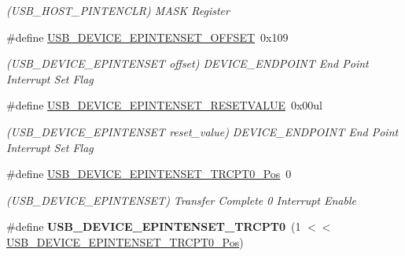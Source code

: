 \begin{DoxyCompactItemize}
\begin{DoxyCompactList}\small\item\em (U\+S\+B\+\_\+\+H\+O\+S\+T\+\_\+\+P\+I\+N\+T\+E\+N\+C\+L\+R) M\+A\+S\+K Register \end{DoxyCompactList}\item 
\hypertarget{group___s_a_m_l21___u_s_b_ga59337d0066849bd4f531ba5efcd153c9}{}\#define \hyperlink{group___s_a_m_l21___u_s_b_ga59337d0066849bd4f531ba5efcd153c9}{U\+S\+B\+\_\+\+D\+E\+V\+I\+C\+E\+\_\+\+E\+P\+I\+N\+T\+E\+N\+S\+E\+T\+\_\+\+O\+F\+F\+S\+E\+T}~0x109\label{group___s_a_m_l21___u_s_b_ga59337d0066849bd4f531ba5efcd153c9}

\begin{DoxyCompactList}\small\item\em (U\+S\+B\+\_\+\+D\+E\+V\+I\+C\+E\+\_\+\+E\+P\+I\+N\+T\+E\+N\+S\+E\+T offset) D\+E\+V\+I\+C\+E\+\_\+\+E\+N\+D\+P\+O\+I\+N\+T End Point Interrupt Set Flag \end{DoxyCompactList}\item 
\hypertarget{group___s_a_m_l21___u_s_b_ga51ab3a66f621e31c55e0676d4d6484a1}{}\#define \hyperlink{group___s_a_m_l21___u_s_b_ga51ab3a66f621e31c55e0676d4d6484a1}{U\+S\+B\+\_\+\+D\+E\+V\+I\+C\+E\+\_\+\+E\+P\+I\+N\+T\+E\+N\+S\+E\+T\+\_\+\+R\+E\+S\+E\+T\+V\+A\+L\+U\+E}~0x00ul\label{group___s_a_m_l21___u_s_b_ga51ab3a66f621e31c55e0676d4d6484a1}

\begin{DoxyCompactList}\small\item\em (U\+S\+B\+\_\+\+D\+E\+V\+I\+C\+E\+\_\+\+E\+P\+I\+N\+T\+E\+N\+S\+E\+T reset\+\_\+value) D\+E\+V\+I\+C\+E\+\_\+\+E\+N\+D\+P\+O\+I\+N\+T End Point Interrupt Set Flag \end{DoxyCompactList}\item 
\hypertarget{group___s_a_m_l21___u_s_b_gabf4cf455ecc583d83a33aa84c449aa01}{}\#define \hyperlink{group___s_a_m_l21___u_s_b_gabf4cf455ecc583d83a33aa84c449aa01}{U\+S\+B\+\_\+\+D\+E\+V\+I\+C\+E\+\_\+\+E\+P\+I\+N\+T\+E\+N\+S\+E\+T\+\_\+\+T\+R\+C\+P\+T0\+\_\+\+Pos}~0\label{group___s_a_m_l21___u_s_b_gabf4cf455ecc583d83a33aa84c449aa01}

\begin{DoxyCompactList}\small\item\em (U\+S\+B\+\_\+\+D\+E\+V\+I\+C\+E\+\_\+\+E\+P\+I\+N\+T\+E\+N\+S\+E\+T) Transfer Complete 0 Interrupt Enable \end{DoxyCompactList}\item 
\hypertarget{group___s_a_m_l21___u_s_b_ga5e52d0998221f90f7e9ee16336de52f3}{}\#define {\bfseries U\+S\+B\+\_\+\+D\+E\+V\+I\+C\+E\+\_\+\+E\+P\+I\+N\+T\+E\+N\+S\+E\+T\+\_\+\+T\+R\+C\+P\+T0}~(1 $<$$<$ \hyperlink{group___s_a_m_l21___u_s_b_gabf4cf455ecc583d83a33aa84c449aa01}{U\+S\+B\+\_\+\+D\+E\+V\+I\+C\+E\+\_\+\+E\+P\+I\+N\+T\+E\+N\+S\+E\+T\+\_\+\+T\+R\+C\+P\+T0\+\_\+\+Pos})\label{group___s_a_m_l21___u_s_b_ga5e52d0998221f90f7e9ee16336de52f3}


\end{DoxyCompactItemize}
